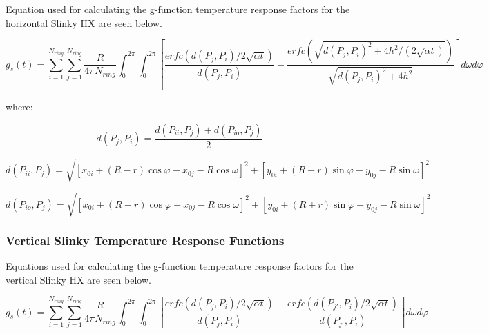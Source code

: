 Equation used for calculating the g-function temperature response factors for the horizontal Slinky HX are seen below.

{\scriptsize
\begin{equation}
g_s\left(t\right) = \sum_{i = 1}^{N_{ring}} \sum_{j = 1}^{N_{ring}} \frac{R}{4\pi N_{ring}} \int_0^{2\pi} \int_0^{2\pi} 
            \left[ 
                \frac{erfc\left(d\left(P_j,P_i\right)/2\sqrt{\alpha t}\right)}{d\left(P_j,P_i\right)} - 
                \frac{erfc\left(\sqrt{d\left(P_j,P_i\right)^2+4h^2/\left(2\sqrt{\alpha t}\right)}\right)}{\sqrt{d\left(P_j,P_i\right)^2+4h^2} }
            \right]d\omega d\varphi
\end{equation}}

where:

\begin{equation}
d\left(P_j,P_i\right) = \frac{d\left(P_{ii},P_j\right) + d\left(P_{io},P_j\right)}{2}
\end{equation}

\begin{equation}
d\left(P_{ii},P_j\right) = \sqrt{\left[x_{0i} + \left(R-r\right)\cos \varphi - x_{0j}-R\cos \omega\right]^2 + \left[y_{0i} + \left(R-r\right)\sin \varphi - y_{0j}-R\sin \omega\right]^2}
\end{equation}

\begin{equation}
d\left(P_{io},P_j\right) = \sqrt{\left[x_{0i} + \left(R-r\right)\cos \varphi - x_{0j}-R\cos \omega\right]^2 + \left[y_{0i} + \left(R+r\right)\sin \varphi - y_{0j}-R\sin \omega\right]^2}
\end{equation}

\subsubsection{Vertical Slinky Temperature Response Functions}\label{vertical-slinky-temperature-response-functions}

Equations used for calculating the g-function temperature response factors for the vertical Slinky HX are seen below.

\begin{equation}
g_s\left(t\right) = \sum_{i = 1}^{N_{ring}} \sum_{j = 1}^{N_{ring}} \frac{R}{4\pi N_{ring}} \int_0^{2\pi} \int_0^{2\pi} 
            \left[ 
                \frac{erfc\left(d\left(P_j,P_i\right)/2\sqrt{\alpha t}\right)}{d\left(P_j,P_i\right)} - 
                \frac{erfc\left(d\left(P_{j'},P_i\right)/2\sqrt{\alpha t}\right)}{d\left(P_{j'},P_i\right)}
            \right]d\omega d\varphi
\end{equation}

